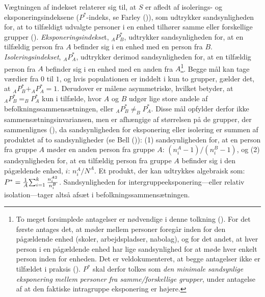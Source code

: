 \documentclass[
]{book}
\begin{document}
Vægtningen af indekset relaterer sig til, at \(S\) er afledt af isolerings- og eksponeringsindeksene (\(P^{*}\)-indeks, se Farley ()), som udtrykker sandsynligheden for, at to tilfældigt udvalgte personer i en enhed tilhører samme eller forskellige grupper (). \emph{Eksponeringsindekse}t, \(_{A}P^{*}_{B}\), udtrykker sandsynligheden for, at en tilfældig person fra \(A\) befinder sig i en enhed med en person fra \(B\). \emph{Isoleringsindekset}, \(_{A}P^{*}_{A}\), udtrykker derimod sandsynligheden for, at en tilfældig person fra \(A\) befinder sig i en enhed med en anden fra \(A\)\footnote{To meget forsimplede antagelser er nødvendige i denne tolkning (). For det første antages det, at møder mellem personer foregår inden for den pågældende enhed (skoler, arbejdspladser, nabolag), og for det andet, at hver person i en pågældende enhed har lige sandsynlighed for at møde hver enkelt person inden for enheden. Det er veldokumenteret, at begge antagelser ikke er tilfældet i praksis (). \(P^{*}\) skal derfor tolkes som \emph{den minimale sandsynlige eksponering mellem personer fra samme/forskellige grupper}, under antagelse af at den faktiske intragruppe eksponering er højere.}. Begge mål kan tage værdier fra \(0\) til \(1\), og hvis populationen er inddelt i kun to grupper, gælder det, at \(_{A}P^{*}_{B} + _{A}P^{*}_{A} = 1\). Derudover er målene asymmetriske, hvilket betyder, at \(_{A}P^{*}_{B} = _{B}P^{*}_{A}\) kun i tilfælde, hvor \(A\) og \(B\) udgør lige store andele af befolkningssammensætningen, eller \(_{A}P^{*}_{B} \neq _{B}P^{*}_{A}\). Disse mål opfylder derfor ikke sammensætningsinvariansen, men er afhængige af størrelsen på de grupper, der sammenlignes (), da sandsynligheden for eksponering eller isolering er summen af produktet af to sandsynligheder (se Bell ()): (1) sandsynligheden for, at en person fra gruppe \(A\) møder en anden person fra gruppe \(A\): \(\left( n_{i}^{A} - 1 \right) / \left( n_{i}^{B} - 1 \right)\), og (2) sandsynligheden for, at en tilfældig person fra gruppe \(A\) befinder sig i den pågældende enhed, \(i\): \(n_{i}^{A} / N^{A}\). Et produkt, der kan udtrykkes algebraisk som: \(P^{*}=\frac{1}{A} {\textstyle \sum_{i=1}^{k}\frac{n_{i}^{A \space 2}}{n_{i}^{B}}}\). Sandsynligheden for intergruppeeksponering---eller relativ isolation---tager altså afsæt i befolkningssammensætningen.
\end{document}
